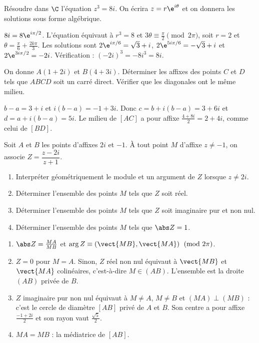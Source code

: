 \begin{exercise}
Résoudre dans $\C$ l'équation $z^3=8i$. On écrira $z=r\e^{i\theta}$ et on donnera les solutions sous forme algébrique.
\end{exercise}
\begin{solution}
$8i=8\e^{i\pi/2}$. L'équation équivaut à $r^3=8$ et $3\theta\equiv\frac\pi2\pmod{2\pi}$, soit $r=2$ et $\theta=\frac\pi6+\frac{2k\pi}3$. Les solutions sont $2\e^{i\pi/6}=\sqrt3+i$, $2\e^{5i\pi/6}=-\sqrt3+i$ et $2\e^{3i\pi/2}=-2i$. Vérification : $(-2i)^3=-8i^3=8i$.
\end{solution}

\begin{exercise}
On donne $A(1+2i)$ et $B(4+3i)$. Déterminer les affixes des points $C$ et $D$ tels que $ABCD$ soit un carré direct. Vérifier que les diagonales ont le même milieu.
\end{exercise}
\begin{solution}
$b-a=3+i$ et $i(b-a)=-1+3i$. Donc $c=b+i(b-a)=3+6i$ et $d=a+i(b-a)=5i$. Le milieu de $[AC]$ a pour affixe $\frac{4+8i}2=2+4i$, comme celui de $[BD]$.
\end{solution}

\begin{exercise}
Soit $A$ et $B$ les points d'affixes $2i$ et $-1$. À tout point $M$ d'affixe $z\neq-1$, on associe $Z=\dfrac{z-2i}{z+1}$.
\begin{enumerate}
\item Interpréter géométriquement le module et un argument de $Z$ lorsque $z\neq2i$.
\item Déterminer l'ensemble des points $M$ tels que $Z$ soit réel.
\item Déterminer l'ensemble des points $M$ tels que $Z$ soit imaginaire pur et non nul.
\item Déterminer l'ensemble des points $M$ tels que $\abs Z=1$.
\end{enumerate}
\end{exercise}
\begin{solution}
\begin{enumerate}
\item $\abs Z=\frac{MA}{MB}$ et $\arg Z\equiv\left(\vect{MB},\vect{MA}\right)\pmod{2\pi}$.
\item $Z=0$ pour $M=A$. Sinon, $Z$ réel non nul équivaut à $\vect{MB}$ et $\vect{MA}$ colinéaires, c'est-à-dire $M\in(AB)$. L'ensemble est la droite $(AB)$ privée de $B$.
\item $Z$ imaginaire pur non nul équivaut à $M\neq A$, $M\neq B$ et $(MA)\perp(MB)$ : c'est le cercle de diamètre $[AB]$ privé de $A$ et $B$. Son centre a pour affixe $\frac{-1+2i}2$ et son rayon vaut $\frac{\sqrt5}2$.
\item $MA=MB$ : la médiatrice de $[AB]$.
\end{enumerate}
\end{solution}

